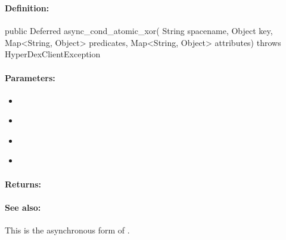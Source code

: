 \pagebreak
\subsubsection{}
\label{api:java:async_cond_atomic_xor}


\paragraph{Definition:}
\begin{javacode}
public Deferred async_cond_atomic_xor(
        String spacename,
        Object key,
        Map<String, Object> predicates,
        Map<String, Object> attributes) throws HyperDexClientException
\end{javacode}

\paragraph{Parameters:}
\begin{itemize}[noitemsep]
\item {}\\

\item {}\\

\item {}\\

\item {}\\

\end{itemize}

\paragraph{Returns:}


\paragraph{See also:}  This is the asynchronous form of .

\pagebreak
